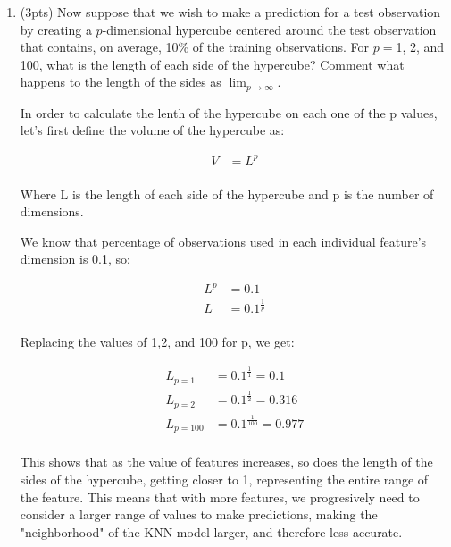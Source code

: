 \documentclass[a4paper]{article}
\theoremstyle{definition}
\newenvironment{soln}{
    \leavevmode\color{blue}\ignorespaces
}{}
\begin{document}
\begin{enumerate}
\begin{enumerate}
	\item (3pts) Now suppose that we wish to make a prediction for a test observation by creating a $p$-dimensional hypercube centered around the test observation that contains, on average, 10\% of the training observations. For $p =$1, 2, and 100, what is the length of each side of the hypercube? Comment what happens to the length of the sides as $\lim_{{p \to \infty}}$.
	
	\begin{soln}  In order to calculate the lenth of the hypercube on each one of the p values, let's first define the volume of the hypercube as:

		$$
		\begin{align}
		V &= L^{p} \\
		\end{align}
		$$
		
		Where L is the length of each side of the hypercube and p is the number of dimensions.
		
		We know that percentage of observations used in each individual feature's dimension is 0.1, so:
		
		$$
		\begin{align}
		L^{p} &= 0.1 \\
		L &= 0.1^{\frac{1}{p}} \\
		\end{align}
		$$
		
		Replacing the values of 1,2, and 100 for p, we get:
		
		$$
		\begin{align}
		L_{p=1} &= 0.1^{\frac{1}{1}} = 0.1 \\
		L_{p=2} &= 0.1^{\frac{1}{2}} = 0.316 \\
		L_{p=100} &= 0.1^{\frac{1}{100}} = 0.977 \\
		\end{align}
		$$
		
		This shows that as the value of features increases, so does the length of the sides of the hypercube, getting closer to 1, representing the entire range of the feature. This means that with more features, we progresively need to consider a larger range of values to make predictions, making the "neighborhood" of the KNN model larger, and therefore less accurate. \end{soln}
	
\end{enumerate}


\end{enumerate}
\end{document}
